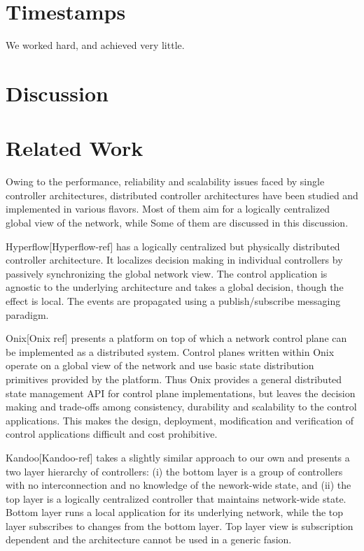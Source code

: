 \documentclass[10pt, twocolumn]{article}
\begin{document}
\section{Timestamps}
\label{sec:timestamps}
We worked hard, and achieved very little.

\section{Discussion}
\label{sec:discuss}

\section{Related Work}
\label{sec:related}
Owing to the performance, reliability and scalability issues faced by single controller architectures, distributed controller architectures have been studied and implemented in various flavors. Most of them aim for a logically centralized global view of the network, while Some of them are discussed in this discussion.

Hyperflow[Hyperflow-ref] has a logically centralized but physically distributed controller architecture. It localizes decision making in individual controllers by passively synchronizing the global network view. The control application is agnostic to the underlying architecture and takes a global decision, though the effect is local. The events are propagated using a publish/subscribe messaging paradigm.

Onix[Onix ref] presents a platform on top of which a network control plane can be implemented as a distributed system. Control planes written within Onix operate on a global view of the network and use basic state distribution primitives provided by the platform. Thus Onix provides a general distributed state management API for control plane implementations, but leaves the decision making and trade-offs among consistency, durability and scalability to the control applications. This makes the design, deployment, modification and verification of control applications difficult and cost prohibitive.

Kandoo[Kandoo-ref] takes a slightly similar approach to our own and presents a two layer hierarchy of controllers: (i) the bottom layer is a group of controllers with no interconnection and no knowledge of the nework-wide state, and (ii) the top layer is a logically centralized controller that maintains network-wide state. Bottom layer runs a local application for its underlying network, while the top layer subscribes to changes from the bottom layer. Top layer view is subscription dependent and the architecture cannot be used in a generic fasion.
\end{document}
